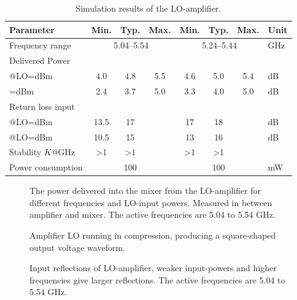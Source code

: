 			\begin{table}[hbt!]
				\caption[Simulation results of the LO-amplifier.]{Simulation results of the LO-amplifier.\disclaimer}
				\label{tab:resultlo}
				\centering
				\begin{tabular}{ l c c c c c c l } \toprule
					Parameter & Min. & Typ. & Max. & Min. & Typ. & Max. & Unit \\\midrule
					Frequency range & \multicolumn{3}{c}{5.04--5.54} & \multicolumn{3}{c}{5.24--5.44} & GHz \\
					Delivered Power & & & & & & \\
						\qquad @LO=\unit[-2--0]{dBm} 		& 4.0 & 4.8 & 5.5 & 4.6 & 5.0 & 5.4 & dB \\
						\qquad@LO=\unit[-4-- -2]{dBm} 		& 2.4 & 3.7 & 5.0 & 3.3 & 4.0 & 5.0 & dB \\
					Return loss input  & & & & & & \\
						\qquad @LO=\unit[-2--0]{dBm} 	& 13.5 & 17 & & 17 & 18 & & dB \\
						\qquad @LO=\unit[-4-- -2]{dBm} 	& 10.5 & 15 & & 13 & 16 & & dB \\
					Stability $K$@\unit[0--80]{GHz} & >1 & >1 &  & >1 & >1 &  & \\
					Power consumption &  & 100 &  & & 100 & & mW  \\\bottomrule
				\end{tabular}
			\end{table}

			\begin{figure}[hbt!]
				\centering
				\caption[Output power from LO-amplifier]{The power delivered into the mixer from the LO-amplifier for different frequencies and LO-input powers. Measured in between amplifier and mixer. The active frequencies are 5.04 to 5.54 GHz.}\label{fig:lo_delivered_power}
			\end{figure}
			\begin{figure}[hbt!]
				\centering
				\caption[Amplifier LO waveform]{Amplifier LO running in compression, producing a square-shaped output voltage waveform.}\label{fig:lo_waveform}
			\end{figure}

			\begin{figure}[hbt!]
				\centering
				\caption[Input reflections of LO-amplifier]{Input reflections of LO-amplifier, weaker input-powers and higher frequencies give larger reflections. The active frequencies are 5.04 to 5.54 GHz.}\label{fig:lo_reflections}
			\end{figure}



